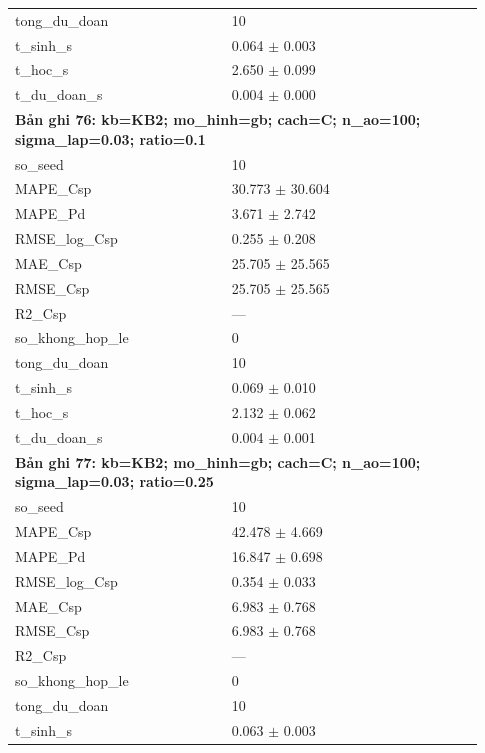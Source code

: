 \begin{longtable}{p{0.43\linewidth}p{0.50\linewidth}}
tong\_\allowbreak du\_\allowbreak doan & 10 \\
t\_\allowbreak sinh\_\allowbreak s & 0.064 $\pm$ 0.003 \\
t\_\allowbreak hoc\_\allowbreak s & 2.650 $\pm$ 0.099 \\
t\_\allowbreak du\_\allowbreak doan\_\allowbreak s & 0.004 $\pm$ 0.000 \\
\midrule
\multicolumn{2}{p{0.95\linewidth}}{\textbf{Bản ghi 76: kb=KB2; mo\_hinh=gb; cach=C; n\_ao=100; sigma\_lap=0.03; ratio=0.1}} \\
so\_\allowbreak seed & 10 \\
MAPE\_\allowbreak Csp & 30.773 $\pm$ 30.604 \\
MAPE\_\allowbreak Pd & 3.671 $\pm$ 2.742 \\
RMSE\_\allowbreak log\_\allowbreak Csp & 0.255 $\pm$ 0.208 \\
MAE\_\allowbreak Csp & 25.705 $\pm$ 25.565 \\
RMSE\_\allowbreak Csp & 25.705 $\pm$ 25.565 \\
R2\_\allowbreak Csp & — \\
so\_\allowbreak khong\_\allowbreak hop\_\allowbreak le & 0 \\
tong\_\allowbreak du\_\allowbreak doan & 10 \\
t\_\allowbreak sinh\_\allowbreak s & 0.069 $\pm$ 0.010 \\
t\_\allowbreak hoc\_\allowbreak s & 2.132 $\pm$ 0.062 \\
t\_\allowbreak du\_\allowbreak doan\_\allowbreak s & 0.004 $\pm$ 0.001 \\
\midrule
\multicolumn{2}{p{0.95\linewidth}}{\textbf{Bản ghi 77: kb=KB2; mo\_hinh=gb; cach=C; n\_ao=100; sigma\_lap=0.03; ratio=0.25}} \\
so\_\allowbreak seed & 10 \\
MAPE\_\allowbreak Csp & 42.478 $\pm$ 4.669 \\
MAPE\_\allowbreak Pd & 16.847 $\pm$ 0.698 \\
RMSE\_\allowbreak log\_\allowbreak Csp & 0.354 $\pm$ 0.033 \\
MAE\_\allowbreak Csp & 6.983 $\pm$ 0.768 \\
RMSE\_\allowbreak Csp & 6.983 $\pm$ 0.768 \\
R2\_\allowbreak Csp & — \\
so\_\allowbreak khong\_\allowbreak hop\_\allowbreak le & 0 \\
tong\_\allowbreak du\_\allowbreak doan & 10 \\
t\_\allowbreak sinh\_\allowbreak s & 0.063 $\pm$ 0.003 \\

\end{longtable}
